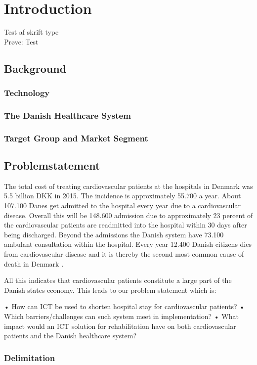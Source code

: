 \chapter{Introduction}


Test af skrift type \\
Prøve: \cite{example} Test

\section{Background}
\subsection{Technology}
\subsection{The Danish Healthcare System}
\subsection{Target Group and Market Segment}


\section{Problemstatement}
The total cost of treating cardiovascular patients at the hospitals in Denmark was 5.5 billion DKK in 2015. The incidence is approximately 55.700 a year. About 107.100 Danes get admitted to the hospital every year due to a cardiovascular disease. Overall this will be 148.600 admission due to approximately 23 percent of the cardiovascular patients are readmitted into the hospital within 30 days after being discharged. Beyond the admissions the Danish system have 73.100 ambulant consultation within the hospital. Every year 12.400 Danish citizens dies from cardiovascular disease and it is thereby the second most common cause of death in Denmark . 

All this indicates that cardiovascular patients constitute a large part of the Danish states economy. This leads to our problem statement which is:

•	How can ICT be used to shorten hospital stay for cardiovascular patients?
•	Which barriers/challenges can such system meet in implementation?
•	What impact would an ICT solution for rehabilitation have on both cardiovascular patients and the Danish healthcare system?


\subsection{Delimitation}
      

